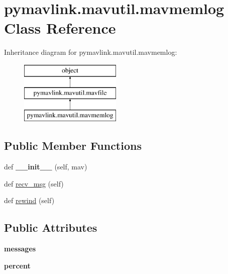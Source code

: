 \hypertarget{classpymavlink_1_1mavutil_1_1mavmemlog}{}\section{pymavlink.\+mavutil.\+mavmemlog Class Reference}
\label{classpymavlink_1_1mavutil_1_1mavmemlog}
Inheritance diagram for pymavlink.\+mavutil.\+mavmemlog\+:\begin{figure}[H]
\begin{center}
\leavevmode
\includegraphics[height=3.000000cm]{classpymavlink_1_1mavutil_1_1mavmemlog}
\end{center}
\end{figure}
\subsection*{Public Member Functions}
\begin{DoxyCompactItemize}
\item 
\mbox{\label{classpymavlink_1_1mavutil_1_1mavmemlog_ad593163b44c0cb40074ed0b28553a5f9}} 
def {\bfseries \+\_\+\+\_\+init\+\_\+\+\_\+} (self, mav)
\item 
def \hyperlink{classpymavlink_1_1mavutil_1_1mavmemlog_a7a84e52fc8bf9a84624c848c4a2229da}{recv\+\_\+msg} (self)
\item 
def \hyperlink{classpymavlink_1_1mavutil_1_1mavmemlog_ac3a0c1c0621a7b6ed341779bd313d493}{rewind} (self)
\end{DoxyCompactItemize}
\subsection*{Public Attributes}
\begin{DoxyCompactItemize}
\item 
\mbox{\label{classpymavlink_1_1mavutil_1_1mavmemlog_a72353a723c995748c9d353e8b233f650}} 
{\bfseries messages}
\item 
\mbox{\label{classpymavlink_1_1mavutil_1_1mavmemlog_a44ce7e3b3214bec1c9aaa2484cd7ebad}} 
{\bfseries percent}
\end{DoxyCompactItemize}


